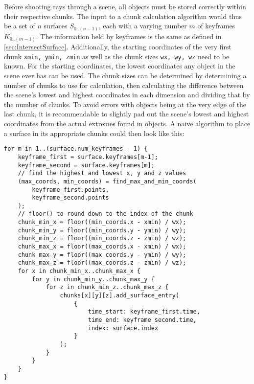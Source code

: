 Before shooting rays through a scene,
all objects must be stored correctly within their respective chunks.
The input to a chunk calculation algorithm would thus be a set of \(n\) surfaces \(S_{0..(n-1)}\),
each with a varying number \(m\) of keyframes \(K_{0..(m-1)}\).
The information held by keyframes is the same as defined in \autoref{sec:IntersectSurface}.
\newline
Additionally, the starting coordinates of the very first chunk \verb|xmin, ymin, zmin|
as well as the chunk sizes \verb|wx, wy, wz| need to be known.
For the starting coordinates, the lowest coordinates any object in the scene ever has can be used.
The chunk sizes can be determined by determining a number of chunks to use for calculation,
then calculating the difference between the scene's lowest and highest coordinates in each dimension
and dividing that by the number of chunks.
To avoid errors with objects being at the very edge of the last chunk,
it is recommendable to slightly pad out the scene's lowest and highest coordinates
from the actual extremes found in objects.
\newline
A naive algorithm to place a surface in its appropriate chunks could then look like this:

\begin{verbatim}
for m in 1..(surface.num_keyframes - 1) {
    keyframe_first = surface.keyframes[m-1];
    keyframe_second = surface.keyframes[m];
    // find the highest and lowest x, y and z values
    (max_coords, min_coords) = find_max_and_min_coords(
        keyframe_first.points,
        keyframe_second.points
    );
    // floor() to round down to the index of the chunk
    chunk_min_x = floor((min_coords.x - xmin) / wx);
    chunk_min_y = floor((min_coords.y - ymin) / wy);
    chunk_min_z = floor((min_coords.z - zmin) / wz);
    chunk_max_x = floor((max_coords.x - xmin) / wx);
    chunk_max_y = floor((max_coords.y - ymin) / wy);
    chunk_max_z = floor((max_coords.z - zmin) / wz);
    for x in chunk_min_x..chunk_max_x {
        for y in chunk_min_y..chunk_max_y {
            for z in chunk_min_z..chunk_max_z {
                chunks[x][y][z].add_surface_entry(
                    {
                        time_start: keyframe_first.time,
                        time_end: keyframe_second.time,
                        index: surface.index
                    }
                );
            }
        }
    }
}
\end{verbatim}

